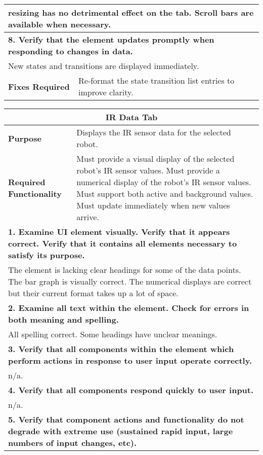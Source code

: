 \begin{longtable}{ l p{10cm} }
 \multicolumn{2}{p{14cm}}{resizing has no detrimental effect on the tab. Scroll bars are available when necessary.}\\
 \hline
 \multicolumn{2}{p{14cm}}{\textbf{8. Verify that the element updates promptly when responding to changes in data.}}\\
 \multicolumn{2}{p{14cm}}{New states and transitions are displayed immediately.}\\
 \hline
 \textbf{Fixes Required} & Re-format the state transition list entries to improve clarity.\\
 \bottomrule
\end{longtable}
\clearpage

\begin{longtable}{ l p{10cm} }
 \hline
 \multicolumn{2}{c}{\textbf{IR Data Tab}}\\
 \hline
 \textbf{Purpose} & Displays the IR sensor data for the selected robot.\\
 \textbf{Required Functionality} & Must provide a visual display of the selected robot's IR sensor values. Must provide a numerical display of the robot's IR sensor values. Must support both active and background values. Must update immediately when new values arrive.\\
 \hline
 \multicolumn{2}{p{14cm}}{\textbf{1. Examine UI element visually. Verify that it appears correct. Verify that it contains all elements necessary to satisfy its purpose.}}\\
 \multicolumn{2}{p{14cm}}{The element is lacking clear headings for some of the data points. The bar graph is visually correct. The numerical displays are correct but their current format takes up a lot of space.}\\
 \hline
 \multicolumn{2}{p{14cm}}{\textbf{2. Examine all text within the element. Check for errors in both meaning and spelling.}}\\
 \multicolumn{2}{p{14cm}}{All spelling correct. Some headings have unclear meanings.}\\
 \hline
 \multicolumn{2}{p{14cm}}{\textbf{3. Verify that all components within the element which perform actions in response to user input operate correctly.}}\\
 \multicolumn{2}{p{14cm}}{n/a.}\\
 \hline
 \multicolumn{2}{p{14cm}}{\textbf{4. Verify that all components respond quickly to user input.}}\\
 \multicolumn{2}{p{14cm}}{n/a.}\\
 \hline
 \multicolumn{2}{p{14cm}}{\textbf{5. Verify that component actions and functionality do not degrade with extreme use (sustained rapid input, large numbers of input changes, etc).}}\\

\end{longtable}
